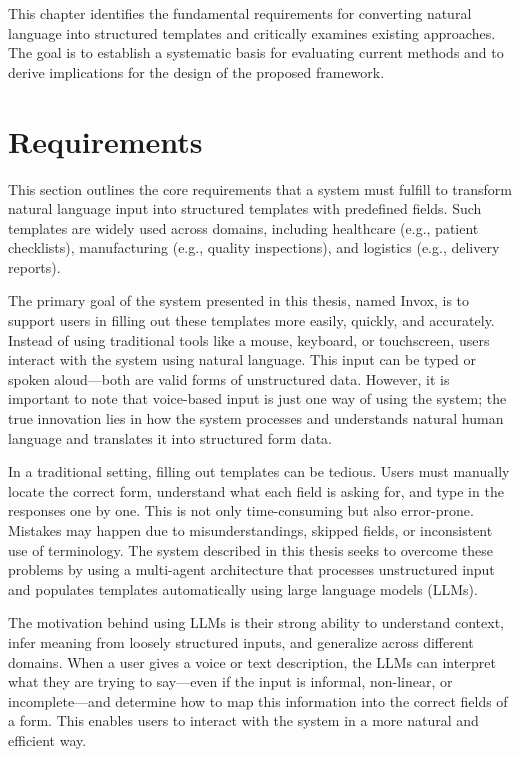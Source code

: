 This chapter identifies the fundamental requirements for converting natural language into structured templates and critically examines existing approaches. The goal is to establish a systematic basis for evaluating current methods and to derive implications for the design of the proposed framework.

\section{Requirements}
\label{sec:requirements}

This section outlines the core requirements that a system must fulfill to transform natural language input into structured templates with predefined fields. Such templates are widely used across domains, including healthcare (e.g., patient checklists), manufacturing (e.g., quality inspections), and logistics (e.g., delivery reports).

The primary goal of the system presented in this thesis, named Invox, is to support users in filling out these templates more easily, quickly, and accurately. Instead of using traditional tools like a mouse, keyboard, or touchscreen, users interact with the system using natural language. This input can be typed or spoken aloud—both are valid forms of unstructured data. However, it is important to note that voice-based input is just one way of using the system; the true innovation lies in how the system processes and understands natural human language and translates it into structured form data.

In a traditional setting, filling out templates can be tedious. Users must manually locate the correct form, understand what each field is asking for, and type in the responses one by one. This is not only time-consuming but also error-prone. Mistakes may happen due to misunderstandings, skipped fields, or inconsistent use of terminology. The system described in this thesis seeks to overcome these problems by using a multi-agent architecture that processes unstructured input and populates templates automatically using large language models (LLMs).

The motivation behind using LLMs is their strong ability to understand context, infer meaning from loosely structured inputs, and generalize across different domains. When a user gives a voice or text description, the LLMs can interpret what they are trying to say—even if the input is informal, non-linear, or incomplete—and determine how to map this information into the correct fields of a form. This enables users to interact with the system in a more natural and efficient way.

